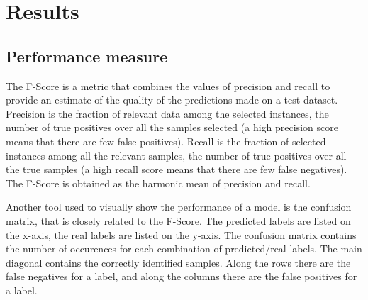 
\section{Results}
\label{sec:results}

\subsection{Performance measure}


The F-Score is a metric that combines the values of precision and recall to
provide an estimate of the quality of the predictions made on a test dataset.
Precision is the fraction of relevant data among the selected instances, the
number of true positives over all the samples selected (a high precision score
means that there are few false positives).
Recall is the fraction of selected instances among all the relevant samples,
the number of true positives over all the true samples (a high recall score
means that there are few false negatives). The F-Score is obtained as the
harmonic mean of precision and recall.

Another tool used to visually show the performance of a model
is the confusion matrix, that is closely related to the F-Score.
The predicted labels are listed on the x-axis,
the real labels are listed on the y-axis.
The confusion matrix contains
the number of occurences
for each combination of predicted/real labels.
The main diagonal contains the correctly identified samples.
Along the rows there are the false negatives for a label,
and along the columns there are the false positives for a label.


